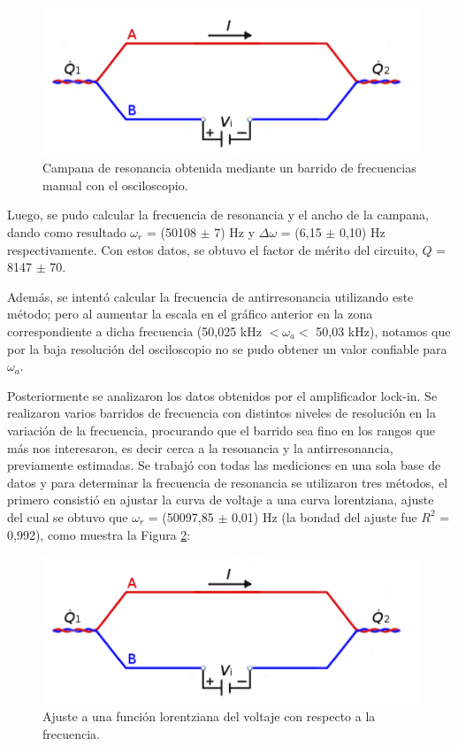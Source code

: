 \documentclass[twoside,twocolumn,a4paper]{article}
\begin{document}
\begin{figure}[H]
\includegraphics[width=\linewidth]{peltier.jpg}
\caption{Campana de resonancia obtenida mediante un barrido de frecuencias manual con el osciloscopio.}
\label{fig:detallecampanaOSC}
\end{figure}

Luego, se pudo calcular la frecuencia de resonancia y el ancho de la campana, dando como resultado $\omega_{r}$ = (50108 $\pm$ 7) Hz y $\Delta \omega$ = (6,15 $\pm$ 0,10) Hz respectivamente. Con estos datos, se obtuvo el factor de m\'erito del circuito, $Q$ = 8147 $\pm$ 70. \newline

\par
Adem\'as, se intent\'o calcular la frecuencia de antirresonancia utilizando este m\'etodo; pero al aumentar la escala en el gr\'afico anterior en la zona correspondiente a dicha frecuencia (50,025 kHz $< \omega_{a} <$ 50,03 kHz), notamos que por la baja resoluci\'on del osciloscopio no se pudo obtener un valor confiable para $\omega_{a}$. \newline


\par
Posteriormente se analizaron los datos obtenidos por el amplificador lock-in. Se realizaron varios barridos de frecuencia con distintos niveles de resoluci\'on en la variaci\'on de la frecuencia, procurando que el barrido sea fino en los rangos que m\'as nos interesaron, es decir cerca a la resonancia y la antirresonancia, previamente estimadas. Se trabaj\'o con todas las mediciones en una sola base de datos y para determinar la frecuencia de resonancia se utilizaron tres m\'etodos, el primero consisti\'o en ajustar la curva de voltaje a una curva lorentziana, ajuste del cual se obtuvo que $\omega_{r}$ = (50097,85 $\pm$ 0,01) Hz (la bondad del ajuste fue $R^{2}$ = 0,992), como muestra la Figura \ref{fig:ajuste}:


\begin{figure}[H]
\includegraphics[width=\linewidth]{peltier.jpg}
\caption{Ajuste a una funci\'on lorentziana del voltaje con respecto a la frecuencia.}
\label{fig:ajuste}
\end{figure}
\end{document}
